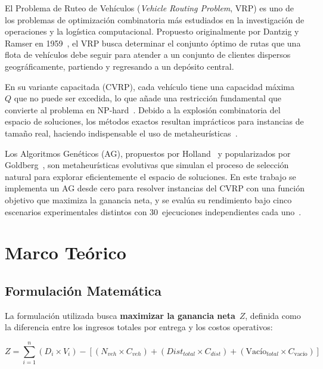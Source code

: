 \documentclass[12pt,letterpaper]{article}
\begin{document}
El Problema de Ruteo de Vehículos (\textit{Vehicle Routing Problem}, VRP) es uno de los problemas de optimización combinatoria más estudiados en la investigación de operaciones y la logística computacional. Propuesto originalmente por Dantzig y Ramser en 1959~\cite{dantzig1959}, el VRP busca determinar el conjunto óptimo de rutas que una flota de vehículos debe seguir para atender a un conjunto de clientes dispersos geográficamente, partiendo y regresando a un depósito central.

En su variante capacitada (CVRP), cada vehículo tiene una capacidad máxima~$Q$ que no puede ser excedida, lo que añade una restricción fundamental que convierte al problema en NP-hard~\cite{toth2002}. Debido a la explosión combinatoria del espacio de soluciones, los métodos exactos resultan imprácticos para instancias de tamaño real, haciendo indispensable el uso de metaheurísticas~\cite{vidal2020}.

Los Algoritmos Genéticos (AG), propuestos por Holland~\cite{holland1975} y popularizados por Goldberg~\cite{goldberg1989}, son metaheurísticas evolutivas que simulan el proceso de selección natural para explorar eficientemente el espacio de soluciones. En este trabajo se implementa un AG desde cero para resolver instancias del CVRP con una función objetivo que maximiza la ganancia neta, y se evalúa su rendimiento bajo cinco escenarios experimentales distintos con 30~ejecuciones independientes cada uno~\cite{porras2026}.

\section{Marco Teórico}

\subsection{Formulación Matemática}

La formulación utilizada busca \textbf{maximizar la ganancia neta}~$Z$, definida como la diferencia entre los ingresos totales por entrega y los costos operativos:

\begin{formulabox}
\begin{equation}
Z = \sum_{i=1}^{n}(D_i \times V_i) - \left[(N_{veh} \times C_{veh}) + (Dist_{total} \times C_{dist}) + (\text{Vac\'io}_{total} \times C_{\text{vac\'io}})\right]
\label{eq:fitness}
\end{equation}
\end{formulabox}
\end{document}
